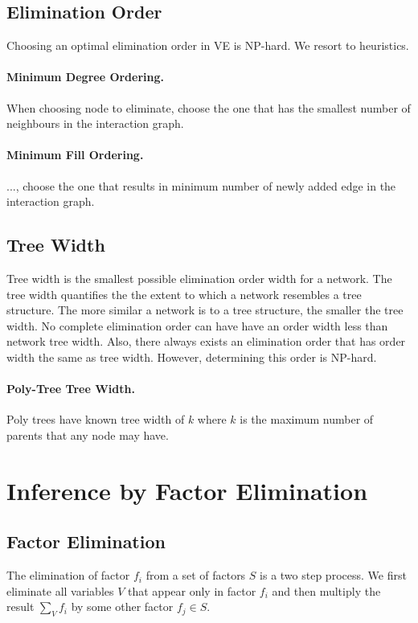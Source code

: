 \documentclass[11pt]{article}
\begin{document}
\subsection{Elimination Order\label{sec:elimination order}} Choosing an optimal elimination order in VE is NP-hard. We resort to heuristics. 

\paragraph{Minimum Degree Ordering.}
When choosing node to eliminate, choose the one that has the smallest number of neighbours in the interaction graph. 

\paragraph{Minimum Fill Ordering.}
..., choose the one that results in minimum number of newly added edge in the interaction graph. 

\subsection{Tree Width}
Tree width is the smallest possible elimination order width for a network. The tree width quantifies the the extent to which a network resembles a tree structure. The more similar a network is to a tree structure, the smaller the tree width. No complete elimination order can have have an order width less than network tree width. Also, there always exists an elimination order that has order width the same as tree width. However, determining this order is NP-hard. 

\paragraph{Poly-Tree Tree Width.} Poly trees have known tree width of $k$ where $k$ is the maximum number of parents that any node may have. 

\section{Inference by Factor Elimination}
\subsection{Factor Elimination}
The elimination of factor $f_i$ from a set of factors $S$ is a two step process. We first eliminate all variables $V$ that appear only in factor $f_i$ and then multiply the result $\sum_V f_i$ by some other factor $f_j \in S$. 
\end{document}
